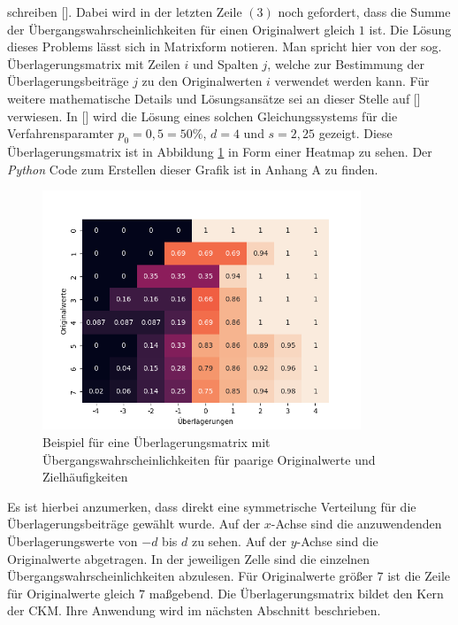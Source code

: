 schreiben [\cite{Höhne}]. Dabei wird in der letzten Zeile $(3)$ noch gefordert, dass die Summe der Übergangswahrscheinlichkeiten für einen Originalwert gleich $1$ ist. Die Lösung dieses Problems lässt sich in Matrixform notieren. Man spricht hier von der sog. Überlagerungsmatrix mit Zeilen $i$ und Spalten $j$, welche zur Bestimmung der Überlagerungsbeiträge $j$ zu den Originalwerten $i$ verwendet werden kann. Für weitere mathematische Details und Lösungsansätze sei an dieser Stelle auf [\cite{Giessing}] verwiesen. In [\cite{Höhne}] wird die Lösung eines solchen Gleichungssystems für die Verfahrensparamter $p_0 = 0,5 = 50\%$, $d = 4$ und $s = 2,25$ gezeigt. Diese Überlagerungsmatrix ist in Abbildung \ref{matrix_plot} in Form einer Heatmap zu sehen. Der \textit{Python} Code zum Erstellen dieser Grafik ist in Anhang A zu finden.

\begin{figure}[H]
    \begin{center}
        \includegraphics[width=0.85\textwidth]{img/matrix.png}
        \caption{Beispiel für eine Überlagerungsmatrix mit Übergangswahrscheinlichkeiten für paarige Originalwerte und Zielhäufigkeiten}
        \label{matrix_plot}
    \end{center}
\end{figure}

Es ist hierbei anzumerken, dass direkt eine symmetrische Verteilung für die Überlagerungsbeiträge gewählt wurde. Auf der $x$-Achse sind die anzuwendenden Überlagerungswerte von $-d$ bis $d$ zu sehen. Auf der $y$-Achse sind die Originalwerte abgetragen. In der jeweiligen Zelle sind die einzelnen Übergangswahrscheinlichkeiten abzulesen. Für Originalwerte  grö\ss er $7$ ist die Zeile für Originalwerte gleich $7$ ma\ss gebend. Die Überlagerungsmatrix bildet den Kern der CKM. Ihre Anwendung wird im nächsten Abschnitt beschrieben.


